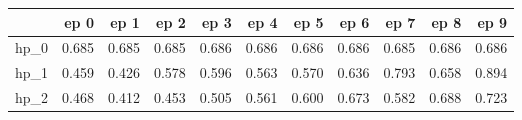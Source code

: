 \begin{tabular}{lrrrrrrrrrr}
\toprule
{} &   ep 0 &   ep 1 &   ep 2 &   ep 3 &   ep 4 &   ep 5 &   ep 6 &   ep 7 &   ep 8 &   ep 9 \\
\midrule
hp\_0 &  0.685 &  0.685 &  0.685 &  0.686 &  0.686 &  0.686 &  0.686 &  0.685 &  0.686 &  0.686 \\
hp\_1 &  0.459 &  0.426 &  0.578 &  0.596 &  0.563 &  0.570 &  0.636 &  0.793 &  0.658 &  0.894 \\
hp\_2 &  0.468 &  0.412 &  0.453 &  0.505 &  0.561 &  0.600 &  0.673 &  0.582 &  0.688 &  0.723 \\
\bottomrule
\end{tabular}
